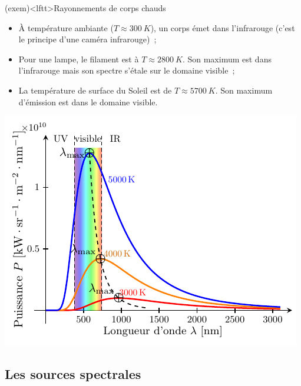 \documentclass[../../main/main.tex]{subfiles}
\begin{document}
\begin{tcb}[sidebyside, lefthand ratio=.5](exem)<lftt>{Rayonnements de corps chauds}
	\begin{itemize}
		\item À température ambiante ($T \approx \SI{300}{K}$), un corps émet
		      dans l'infrarouge (c'est le principe d'une caméra infrarouge)~;
		\item Pour une lampe, le filament est à $T \approx \SI{2800}{K}$. Son
		      maximum est dans l'infrarouge mais son spectre s'étale sur le
		      domaine visible~;
		\item La température de surface du Soleil est de $T \approx
			      \SI{5700}{K}$. Son maximum d'émission est dans le domaine visible.
	\end{itemize}
	\begin{center}
		\pgfspectra[element={H,Fe,Mg,Na},
		absorption, line intensity=40, Imin=.05,
		axis, axis color=white, axis font color=black,
		axis ticks=4, axis unit precision=2,
		axis label text={Longueur d'onde [$\si{nm}$]},
		back=visible10,
		]
		\label{fig:spec_sun}
	\end{center}
	\tcblower
	\begin{center}
		\includegraphics[width=\linewidth]{blackbody}
		\label{fig:cps_chaud}
	\end{center}
\end{tcb}

\subsection{Les sources spectrales}
\end{document}
